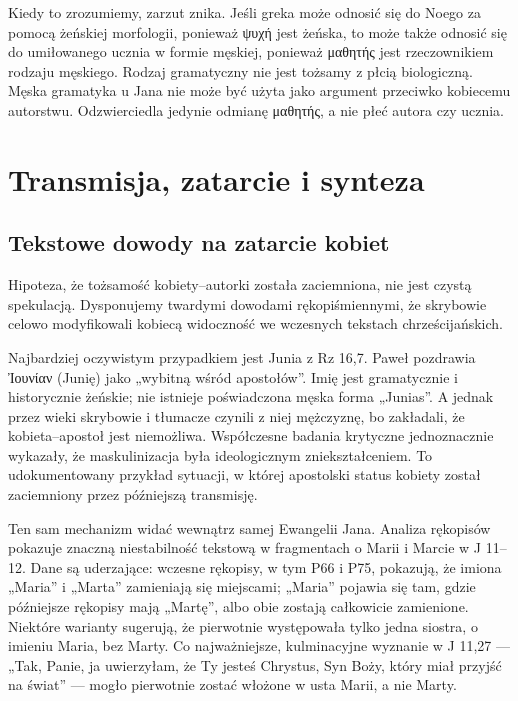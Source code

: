 Kiedy to zrozumiemy, zarzut znika.
Jeśli greka może odnosić się do Noego za pomocą żeńskiej morfologii, ponieważ ψυχή jest żeńska, to może także odnosić się do umiłowanego ucznia w formie męskiej, ponieważ μαθητής jest rzeczownikiem rodzaju męskiego.
Rodzaj gramatyczny nie jest tożsamy z płcią biologiczną.
Męska gramatyka u Jana nie może być użyta jako argument przeciwko kobiecemu autorstwu.
Odzwierciedla jedynie odmianę μαθητής, a nie płeć autora czy ucznia.

\section{Transmisja, zatarcie i synteza}\label{sec:transmission-erasure-synthesis}

\subsection{Tekstowe dowody na zatarcie kobiet}\label{subsec:textual-evidence-of-womens-erasure}

Hipoteza, że tożsamość kobiety–autorki została zaciemniona, nie jest czystą spekulacją.
Dysponujemy twardymi dowodami rękopiśmiennymi, że skrybowie celowo modyfikowali kobiecą widoczność we wczesnych tekstach chrześcijańskich.

Najbardziej oczywistym przypadkiem jest Junia z Rz 16,7.
Paweł pozdrawia Ἰουνίαν (Junię) jako „wybitną wśród apostołów”.
Imię jest gramatycznie i historycznie żeńskie; nie istnieje poświadczona męska forma „Junias”.
A jednak przez wieki skrybowie i tłumacze czynili z niej mężczyznę, bo zakładali, że kobieta–apostoł jest niemożliwa.
Współczesne badania krytyczne jednoznacznie wykazały, że maskulinizacja była ideologicznym zniekształceniem.
To udokumentowany przykład sytuacji, w której apostolski status kobiety został zaciemniony przez późniejszą transmisję.

Ten sam mechanizm widać wewnątrz samej Ewangelii Jana.
Analiza rękopisów \cite{schrader:martha} pokazuje znaczną niestabilność tekstową w fragmentach o Marii i Marcie w J 11--12.
Dane są uderzające:
wczesne rękopisy, w tym P66 i P75, pokazują, że imiona „Maria” i „Marta” zamieniają się miejscami; „Maria” pojawia się tam, gdzie późniejsze rękopisy mają „Martę”, albo obie zostają całkowicie zamienione.
Niektóre warianty sugerują, że pierwotnie występowała tylko jedna siostra, o imieniu Maria, bez Marty.
Co najważniejsze, kulminacyjne wyznanie w J 11,27 — „Tak, Panie, ja uwierzyłam, że Ty jesteś Chrystus, Syn Boży, który miał przyjść na świat” — mogło pierwotnie zostać włożone w usta Marii, a nie Marty.

